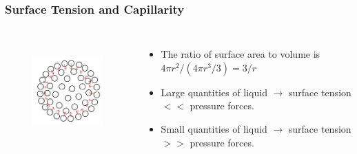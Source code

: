 \documentclass[]{beamer}
\begin{document}
\begin{frame}

  \frametitle{Surface Tension and Capillarity}


  


  
  

   \begin{columns}[c]
    \column{2in}  %
 

    \begin{figure}[h!]
      \begin{center}
        \includegraphics[height=1.6in]{images2/surfacet8.jpg}
      \end{center}
    \end{figure}

    
    \column{2.5in}
 
   \begin{itemize}
     \item  The ratio of surface area to volume is $4\pi r^2/(4\pi r^3/3)=3/r$ \pause
     \item  Large quantities of liquid $\rightarrow$  surface tension $<<$ pressure forces.\pause
     \item Small quantities of liquid $\rightarrow$  surface tension $>>$ pressure forces.
   \end{itemize}


    \end{columns}
 


   \end{frame}



\end{document}
